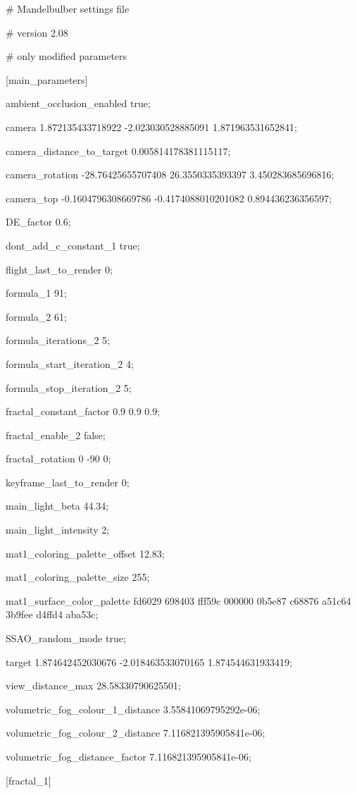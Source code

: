 \# Mandelbulber settings file

\# version 2.08

\# only modified parameters

{[}main\_parameters{]}

ambient\_occlusion\_enabled true;

camera 1.872135433718922 -2.023030528885091 1.871963531652841;

camera\_distance\_to\_target 0.005814178381115117;

camera\_rotation -28.76425655707408 26.3550335393397 3.450283685696816;

camera\_top -0.1604796308669786 -0.4174088010201082 0.894436236356597;

DE\_factor 0.6;

dont\_add\_c\_constant\_1 true;

flight\_last\_to\_render 0;

formula\_1 91;

formula\_2 61;

formula\_iterations\_2 5;

formula\_start\_iteration\_2 4;

formula\_stop\_iteration\_2 5;

fractal\_constant\_factor 0.9 0.9 0.9;

fractal\_enable\_2 false;

fractal\_rotation 0 -90 0;

keyframe\_last\_to\_render 0;

main\_light\_beta 44.34;

main\_light\_intensity 2;

mat1\_coloring\_palette\_offset 12.83;

mat1\_coloring\_palette\_size 255;

mat1\_surface\_color\_palette fd6029 698403 fff59c 000000 0b5e87 c68876 a51c64
3b9fee d4ffd4 aba53c;

SSAO\_random\_mode true;

target 1.874642452030676 -2.018463533070165 1.874544631933419;

view\_distance\_max 28.58330790625501;

volumetric\_fog\_colour\_1\_distance 3.55841069795292e-06;

volumetric\_fog\_colour\_2\_distance 7.116821395905841e-06;

volumetric\_fog\_distance\_factor 7.116821395905841e-06;

{[}fractal\_1{]}

